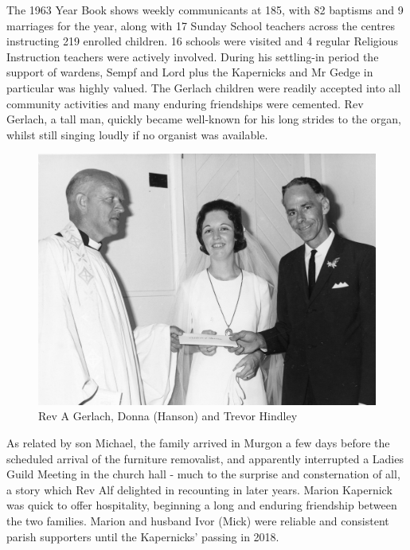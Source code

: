 The 1963 Year Book shows weekly communicants at 185, with 82 baptisms and 9 marriages for the year, along with 17 Sunday School teachers across the centres instructing 219 enrolled children. 16 schools were visited and 4 regular Religious Instruction teachers were actively involved. During his settling-in period the support of wardens, Sempf and Lord plus the Kapernicks and Mr Gedge in particular was highly valued. The Gerlach children were readily accepted into all community activities and many enduring friendships were cemented. Rev Gerlach, a tall man, quickly became well-known for his long strides to the organ, whilst still singing loudly if no organist was available.









\begin{figure}
\begin{center}
\includegraphics[width=1.\linewidth,center]{../images/donnaVestry.jpg}
\caption{Rev A Gerlach, Donna (Hanson) and Trevor Hindley}
\end{center}
\end{figure}




As related by son Michael, the family arrived in Murgon a few days before the scheduled arrival of the furniture removalist, and apparently interrupted a Ladies Guild Meeting in the church hall - much to the surprise and consternation of all, a story which Rev Alf delighted in recounting in later years. Marion Kapernick was quick to offer hospitality, beginning a long and enduring friendship between the two families. Marion and husband Ivor (Mick) were reliable and consistent parish supporters until the Kapernicks' passing in 2018.



